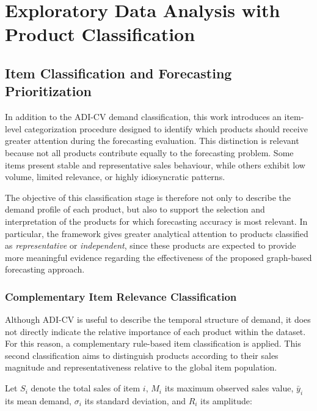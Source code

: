 \chapter{Exploratory Data Analysis with Product Classification}

\section{Item Classification and Forecasting Prioritization}
\label{subsec:item_classification_prioritization}

In addition to the ADI-CV demand classification, this work introduces an item-level categorization procedure designed to identify which products should receive greater attention during the forecasting evaluation. This distinction is relevant because not all products contribute equally to the forecasting problem. Some items present stable and representative sales behaviour, while others exhibit low volume, limited relevance, or highly idiosyncratic patterns.

The objective of this classification stage is therefore not only to describe the demand profile of each product, but also to support the selection and interpretation of the products for which forecasting accuracy is most relevant. In particular, the framework gives greater analytical attention to products classified as \textit{representative} or \textit{independent}, since these products are expected to provide more meaningful evidence regarding the effectiveness of the proposed graph-based forecasting approach.


\subsection{Complementary Item Relevance Classification}
\label{subsec:item_relevance_classification}

Although ADI-CV is useful to describe the temporal structure of demand, it does not directly indicate the relative importance of each product within the dataset. For this reason, a complementary rule-based item classification is applied. This second classification aims to distinguish products according to their sales magnitude and representativeness relative to the global item population.

Let \(S_i\) denote the total sales of item \(i\), \(M_i\) its maximum observed sales value, \(\bar{y}_i\) its mean demand, \(\sigma_i\) its standard deviation, and \(R_i\) its amplitude:

